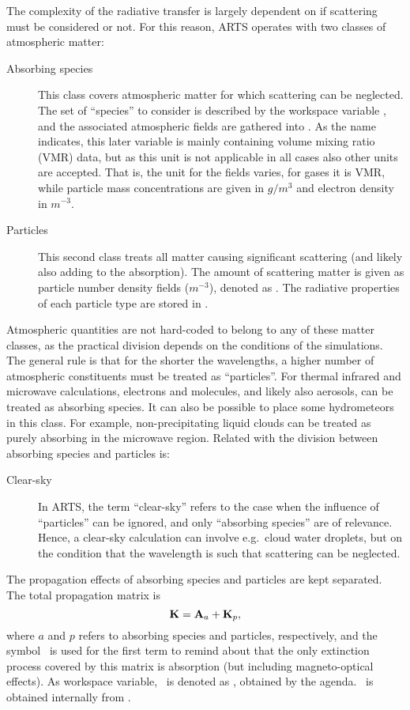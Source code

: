 The complexity of the radiative transfer is largely dependent on if scattering
must be considered or not. For this reason, ARTS operates with two classes of
atmospheric matter:
\begin{description}
\item[Absorbing species] This class covers atmospheric matter for which
  scattering can be neglected. The set of ``species'' to consider is described
  by the workspace variable , and the associated
  atmospheric fields are gathered into . As the name
  indicates, this later variable is mainly containing volume mixing ratio (VMR)
  data, but as this unit is not applicable in all cases also other units are
  accepted. That is, the unit for the fields varies, for gases it is VMR, while
  particle mass concentrations are given in $g/m^3$ and electron density in
  $m^{-3}$. 
\item[Particles] This second class treats all matter causing significant
  scattering (and likely also adding to the absorption). The amount of
  scattering matter is given as particle number density fields ($m^{-3}$),
  denoted as . The radiative properties of each particle
  type are stored in .
\end{description}
Atmospheric quantities are not hard-coded to belong to any of these matter
classes, as the practical division depends on the conditions of the
simulations. The general rule is that for the shorter the wavelengths, a higher
number of atmospheric constituents must be treated as ``particles''. For
thermal infrared and microwave calculations, electrons and molecules, and
likely also aerosols, can be treated as absorbing species. It can also be
possible to place some hydrometeors in this class. For example,
non-precipitating liquid clouds can be treated as purely absorbing in the
microwave region.
Related with the division between absorbing species and particles is:
\begin{description}
\item[Clear-sky] In ARTS, the term ``clear-sky'' refers to the case when the
  influence of ``particles'' can be ignored, and only ``absorbing species'' are
  of relevance. Hence, a clear-sky calculation can involve e.g.\ cloud water
  droplets, but on the condition that the wavelength is such that scattering
  can be neglected.
\end{description}
The propagation effects of absorbing species and particles are kept separated.
The total propagation matrix is 
\begin{equation}
  \label{eq:propmattotal}
  {\bf K} = {\bf A}_{a} + {\bf K}_{p}, 
\end{equation}
where $a$ and $p$ refers to absorbing species and particles, respectively, and
the symbol \AbsMat\ is used for the first term to remind about that the only
extinction process covered by this matrix is absorption (but including
magneto-optical effects). As workspace variable, \ is denoted as
, obtained by the
 agenda. \ is obtained
internally from .

